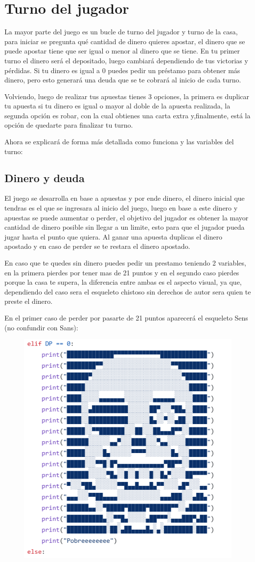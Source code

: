 \section{Turno del jugador}

La mayor parte del juego es un bucle de turno del jugador y turno de la casa, para iniciar se pregunta qué cantidad de dinero quieres apostar, el dinero que se puede apostar tiene que ser igual o menor al dinero que se tiene. En tu primer turno el dinero será el depositado, luego cambiará dependiendo de tus victorias y pérdidas. Si tu dinero es igual a 0 puedes pedir un préstamo para obtener más dinero, pero esto generará una deuda que se te cobrará al inicio de cada turno.

Volviendo, luego de realizar tus apuestas tienes 3 opciones, la primera es duplicar tu apuesta si tu dinero es igual o mayor al doble de la apuesta realizada, la segunda opción es robar, con la cual obtienes una carta extra y,finalmente, está la opción de quedarte para finalizar tu turno.

Ahora se explicará de forma más detallada como funciona y las variables del turno:

\newpage

\subsection{Dinero y deuda}

El juego se desarrolla en base a apuestas y por ende dinero, el dinero inicial que tendras es el que se ingresara al inicio del juego, luego en base a este dinero y apuestas se puede aumentar o perder, el objetivo del jugador es obtener la mayor cantidad de dinero posible sin llegar a un limite, esto para que el jugador pueda jugar hasta el punto que quiera. Al ganar una apuesta duplicas el dinero apostado y en caso de perder se te restara el dinero apostado.

En caso que te quedes sin dinero puedes pedir un prestamo teniendo 2 variables, en la primera pierdes por tener mas de 21 puntos y en el segundo caso pierdes porque la casa te supera, la diferencia entre ambas es el aspecto visual, ya que, dependiendo del caso sera el esqueleto chistoso sin derechos de autor sera quien te preste el dinero.

En el primer caso de perder por pasarte de 21 puntos aparecerá el esqueleto Sens (no confundir con Sans):
\begin{figure}[h]
    \raggedright
    \includegraphics[width=0.5\linewidth]{Imagenes/sens.PNG}
    \label{fig:}
\end{figure}

